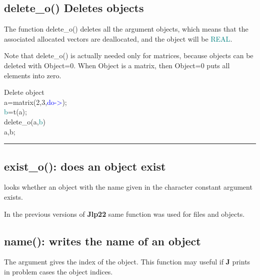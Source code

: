 {\begin{itemize}
\begin{itemize}
\subsection{\textcolor{VioletRed}{delete\_o}() Deletes objects} 
\label{delete_o} 
The function \textcolor{VioletRed}{delete\_o}() deletes all the argument objects, which means that the 
associated allocated vectors are deallocated, and the object will be \textcolor{teal}{REAL}. 
\begin{note} 
Note that \textcolor{VioletRed}{delete\_o}() is actually needed only for matrices, because objects 
can be deleted with Object=0. When Object is a matrix, then Object=0 puts all elements 
into zero. 
\end{note} 
\singlespacing 
\begin{example}[deleteoex]Delete object\\ 
\label{deleteoex} 
\noindent a=\textcolor{VioletRed}{matrix}(2,3,\textcolor{blue}{do->});\\ 
\textcolor{teal}{b}=\textcolor{VioletRed}{t}(a);\\ 
\textcolor{VioletRed}{delete\_o}(a,\textcolor{teal}{b})\\ 
a,b;\\ 
\end{example} 
\vspace{-7mm} \rule{5cm}{0.1pt} 
\onehalfspacing 
\subsection{\textcolor{VioletRed}{exist\_o}(): does an object exist} 
\label{existo} 
looks whether an object with the name given in 
the character constant  argument exists. 
\begin{note} 
In the previous versions of \textbf{Jlp22} same function was used for files and objects. 
\end{note} 
\subsection{\textcolor{VioletRed}{name}(): writes the name of an object} 
\label{name} 
The argument gives the index of the object. This function 
may useful if \textbf{J} prints in problem cases the object indices. 

\end{itemize}
\end{itemize}}

